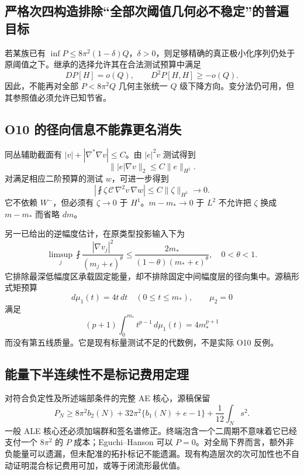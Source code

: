 \documentclass[UTF8,11pt,openany,fontset=none]{ctexbook}
\theoremstyle{definition}
\theoremstyle{remark}
\begin{document}
\subsection{严格次四构造排除``全部次阈值几何必不稳定''的普遍目标}\label{v7-ux4e25ux683cux6b21ux56dbux6784ux9020ux6392ux9664ux5168ux90e8ux6b21ux9608ux503cux51e0ux4f55ux5fc5ux4e0dux7a33ux5b9aux7684ux666eux904dux76eeux6807}

若某族已有 \(\inf P\le8\pi^2(1-\delta)Q\)，\(\delta>0\)，则足够精确的真正极小化序列仍处于原阈值之下。继承的选择允许其在合法测试预算中满足 \[
 DP[H]=o(Q),\qquad D^2P[H,H]\ge-o(Q).
\] 因此，不能再对全部 \(P<8\pi^2Q\) 几何主张统一 \(Q\) 级下降方向。变分法仍可用，但其参照值必须允许已知节省。\cite{I06,B01}

\subsection{O10 的径向信息不能靠更名消失}\label{v7-o10-ux7684ux5f84ux5411ux4fe1ux606fux4e0dux80fdux9760ux66f4ux540dux6d88ux5931}

同丛辅助截面有 \(|v|+|\nabla^*\nabla v|\le C\)。由 \(|e|^2v\) 测试得到 \[
 \||e|\nabla v\|_2\le C\|e\|_{H^1}.
\] 对满足相应二阶预算的测试 \(w\)，可进一步得到 \[
 \left|\fint\zeta\,\mathcal C\,\nabla^2v\,\nabla w\right|
 \le C\|\zeta\|_{H^1}\to0.
\tag{7.9}
\] 它不依赖 \(W^-\)，但必须有 \(\zeta\to0\) 于 \(H^1\)。\(m-m_*\to0\) 于 \(L^2\) 不允许把 \(\zeta\) 换成 \(m-m_*\) 而省略 \(dm\)。\cite{I03}

另一已给出的逆幅度估计，在原类型投影输入下为 \[
 \limsup_j\fint\frac{|\nabla v_j|^2}{(m_j+\epsilon)^\theta}
 \le\frac{2m_*}{(1-\theta)(m_*+\epsilon)^\theta},\quad0<\theta<1.
\] 它排除最深低幅度区承载固定能量，却不排除固定中间幅度层的径向集中。源稿形式矩预算 \[
 d\mu_1(t)=4t\,dt\quad(0\le t\le m_*),\qquad\mu_2=0
\] 满足 \[
 (p+1)\int_0^{m_*}t^{p-1}\,d\mu_1(t)=4m_*^{p+1}
\] 而没有第五线质量。它是现有标量测试不足的代数例，不是实际 O10 反例。\cite{I04,I05}

\subsection{能量下半连续性不是标记费用定理}\label{v7-ux80fdux91cfux4e0bux534aux8fdeux7eedux6027ux4e0dux662fux6807ux8bb0ux8d39ux7528ux5b9aux7406}

对符合负定性及所述端部条件的完整 AE 核心，源稿保留 \[
 P_N\ge8\pi^2b_2(N)+32\pi^2\{b_1(N)+e-1\}
 +\frac1{12}\int_Ns^2.
\] 一般 ALE 核心还必须加端群和签名谱修正。终端泡含一个二周期不意味着它已经支付一个 \(8\pi^2\) 的 \(P\) 成本；Eguchi--Hanson 可以 \(P=0\)。对全局下界而言，额外非负能量可以遗漏，但未配准的拓扑标记不能遗漏。现有构造层次的次可加性也不自动证明混合标记费用可加，或等于闭流形最优值。\cite{I05,B02}
\end{document}
